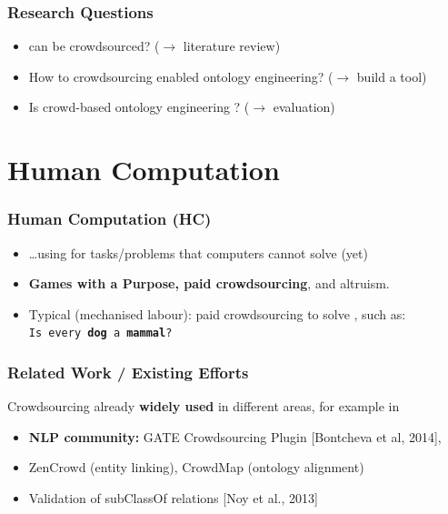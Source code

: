 \documentclass{beamer}
\begin{document}
\begin{frame}
  \frametitle{Research Questions}
  \begin{itemize}
        \item {} can be crowdsourced? ($\rightarrow{}$ literature review)
    \vspace{0.5cm}
        \item How to  crowdsourcing enabled ontology engineering? ($\rightarrow{}$ build a tool) 
    \vspace{0.5cm}
        \item Is crowd-based ontology engineering ? ($\rightarrow{}$ evaluation) 
  \end{itemize}
\end{frame}


\section{Human Computation}
\begin{frame}
  \frametitle{Human Computation (HC)}
  \begin{itemize}
        \item \dots using  for tasks/problems that computers cannot solve (yet)
    \vspace{0.5cm}
        \item {} \textbf{Games with a Purpose, paid crowdsourcing}, and altruism. 
    \vspace{0.5cm}
        \item Typical (mechanised labour): paid crowdsourcing to solve , such as: \\
    \vspace{0.1cm}
        \texttt{Is every \textbf{dog} a \textbf{mammal}?} %
  \end{itemize}
\end{frame}

\begin{frame}
  \frametitle{Related Work / Existing Efforts}
    Crowdsourcing already \textbf{widely used} in different areas, for example in 
    \vspace{0.2cm}
  \begin{itemize}
    \item \textbf{NLP community:} GATE Crowdsourcing Plugin [Bontcheva et al, 2014], 
    \item ZenCrowd (entity linking), CrowdMap (ontology alignment)
    \item Validation of subClassOf relations [Noy et al., 2013]
  \end{itemize}
\end{frame}
\end{document}
